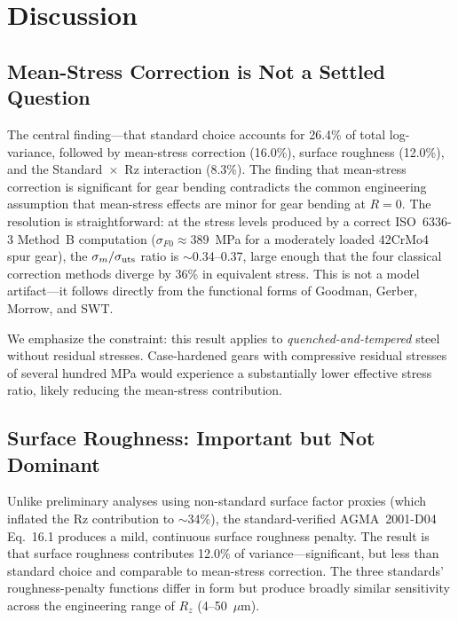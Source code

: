 \documentclass[12pt,a4paper]{article}
\begin{document}
\section{Discussion}
\label{sec:discussion}

\subsection{Mean-Stress Correction is Not a Settled Question}

The central finding---that standard choice accounts for 26.4\% of
total log-variance, followed by mean-stress correction (16.0\%), surface
roughness (12.0\%), and the Standard~$\times$~Rz interaction (8.3\%). The
finding that mean-stress correction is significant for gear bending
contradicts the common engineering assumption that
mean-stress effects are minor for gear bending at $R=0$. The resolution
is straightforward: at the stress levels produced by a correct
ISO~6336-3 Method~B computation ($\sigma_{F0} \approx 389$~MPa for a
moderately loaded 42CrMo4 spur gear), the $\sigma_m/\sigma_{\rm uts}$
ratio is $\sim$0.34--0.37, large enough that the four classical
correction methods diverge by 36\% in equivalent stress. This is not
a model artifact---it follows directly from the functional forms of
Goodman, Gerber, Morrow, and SWT.

We emphasize the constraint: this result applies to
\emph{quenched-and-tempered} steel without residual stresses.
Case-hardened gears with compressive residual stresses of several hundred
MPa would experience a substantially lower effective stress ratio,
likely reducing the mean-stress contribution.

\subsection{Surface Roughness: Important but Not Dominant}

Unlike preliminary analyses using non-standard surface factor proxies
(which inflated the Rz contribution to $\sim$34\%), the
standard-verified AGMA~2001-D04 Eq.~16.1 produces a mild, continuous
surface roughness penalty. The result is that surface roughness
contributes 12.0\% of variance---significant, but less than standard
choice and comparable to mean-stress correction. The three standards'
roughness-penalty functions differ in form but produce broadly similar
sensitivity across the engineering range of $R_z$ (4--50~$\mu$m).
\end{document}
